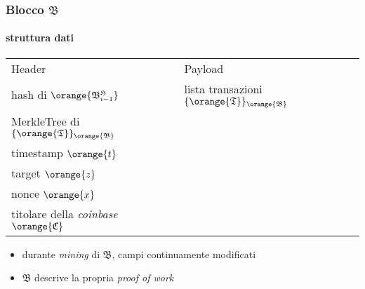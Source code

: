 \begin{frame}
	\frametitle{Blocco $\mathfrak{B}$}
	\framesubtitle{struttura dati} 
	
	\begin{table}
	  \centering
	  \begin{tabular}{ll}
	   	{\color{blue}Header} & {\color{blue}Payload} \\
			\tabitem hash di $\orange{\mathfrak{B}_{i-1}^{\mathfrak{H}}}$ 
				& \tabitem lista transazioni $\{\orange{\mathfrak{T}}\}_{\orange{\mathfrak{B}}}$ \\
			\tabitem MerkleTree di $\{\orange{\mathfrak{T}}\}_\orange{\mathfrak{B}}$ \\
			\tabitem timestamp $\orange{t}$ \\
			\tabitem target $\orange{z}$ \\
			\tabitem nonce $\orange{x}$ \\
			\tabitem titolare della \textit{coinbase} $\orange{\mathfrak{C}}$
	  \end{tabular}
	\end{table}
	
	\begin{itemize}
		\item durante \textit{mining} di $\mathfrak{B}$, campi continuamente modificati
		\item $\mathfrak{B}$ descrive la propria \textit{proof of work}
	\end{itemize}

\end{frame}